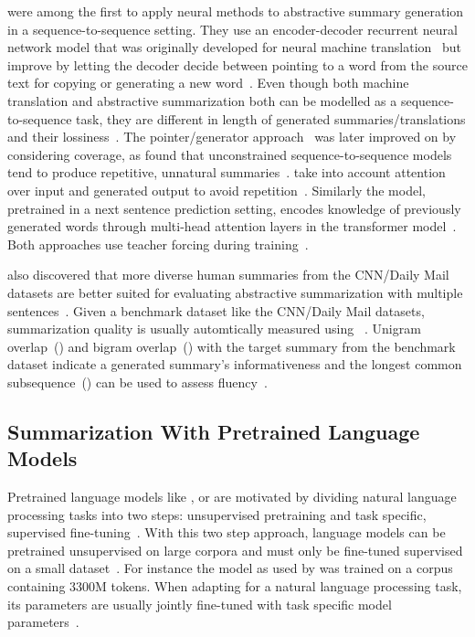 \citeauthor{NallapatiZSGX2016} were among the first to apply neural methods to abstractive summary generation in a sequence-to-sequence setting. They use an encoder-decoder recurrent neural network model that was originally developed for neural machine translation~\cite{BahdanauCB2014} but improve by letting the decoder decide between pointing to a word from the source text for copying or generating a new word~\cite{NallapatiZSGX2016}.
Even though both machine translation and abstractive summarization both can be modelled as a sequence-to-sequence task, they are different in length of generated summaries/translations and their lossiness~\cite{NallapatiZSGX2016}.
The pointer/generator approach~\cite{NallapatiZSGX2016} was later improved on by considering coverage, as \citeauthor{SeeLM2017} found that unconstrained sequence-to-sequence models tend to produce repetitive, unnatural summaries~\cite{SeeLM2017,PaulusXS2018}.
\citeauthor{PaulusXS2018} take into account attention over input and generated output to avoid repetition~\cite{PaulusXS2018}.
Similarly the \Bert model, pretrained in a next sentence prediction setting, encodes knowledge of previously generated words through multi-head attention layers in the transformer model~\cite{DevlinCLT2019}.
Both approaches use teacher forcing during training~\cite{PaulusXS2018,DevlinCLT2019}.

\citeauthor{NallapatiZSGX2016} also discovered that more diverse human summaries from the CNN/Daily Mail datasets are better suited for evaluating abstractive summarization with multiple sentences~\cite{NallapatiZSGX2016,HermannKGEKSB2015}.
Given a benchmark dataset like the CNN/Daily Mail datasets, summarization quality is usually automtically measured using \Rouge~\cite{Lin2004}.
Unigram overlap~() and bigram overlap~() with the target summary from the benchmark dataset indicate a generated summary's informativeness and the longest common subsequence~(\RougeL) can be used to assess fluency~\cite{LiuL2019}.

\subsection{Summarization With Pretrained Language Models}

Pretrained language models like \Elmo, \Gpt or \Bert are motivated by dividing natural language processing tasks into two steps: unsupervised pretraining and task specific, supervised fine-tuning~\cite{PetersNIGCLZ2018,RadfordNSS2018,DevlinCLT2019}.
With this two step approach, language models can be pretrained unsupervised on large corpora and must only be fine-tuned supervised on a small dataset~\cite{DevlinCLT2019}.
For instance the \BertBase model as used by \citeauthor{LiuL2019} was trained on a corpus containing 3300M tokens.
When adapting \Bert for a natural language processing task, its parameters are usually jointly fine-tuned with task specific model parameters~\cite{DevlinCLT2019,LiuL2019}.

